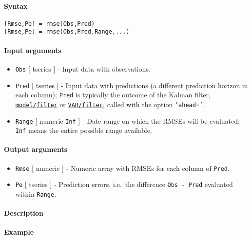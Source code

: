 


	\paragraph{Syntax}

\begin{verbatim}
[Rmse,Pe] = rmse(Obs,Pred)
[Rmse,Pe] = rmse(Obs,Pred,Range,...)
\end{verbatim}

\paragraph{Input arguments}

\begin{itemize}
\item
  \texttt{Obs} {[} tseries {]} - Input data with observations.
\item
  \texttt{Pred} {[} tseries {]} - Input data with predictions (a
  different prediction horizon in each column); \texttt{Pred} is
  typically the outcome of the Kalman filter,
  \href{model/filter}{\texttt{model/filter}} or
  \href{VAR/filter}{\texttt{VAR/filter}}, called with the option
  \texttt{'ahead='}.
\item
  \texttt{Range} {[} numeric \textbar{} \texttt{Inf} {]} - Date range on
  which the RMSEs will be evaluated; \texttt{Inf} means the entire
  possible range available.
\end{itemize}

\paragraph{Output arguments}

\begin{itemize}
\item
  \texttt{Rmse} {[} numeric {]} - Numeric array with RMSEs for each
  column of \texttt{Pred}.
\item
  \texttt{Pe} {[} tseries {]} - Prediction errors, i.e.~the difference
  \texttt{Obs - Pred} evaluated within \texttt{Range}.
\end{itemize}

\paragraph{Description}

\paragraph{Example}


